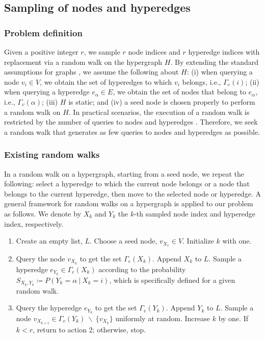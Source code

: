 \subsection{Sampling of nodes and hyperedges} \label{section:2.2}

\subsubsection{Problem definition}

Given a positive integer $r$, we sample $r$ node indices and $r$ hyperedge indices with replacement via a random walk on the hypergraph $H$. 
By extending the standard assumptions for graphs \cite{gjoka2010,nakajima2023}, we assume the following about $H$: (i) when querying a node $v_i \in V$, we obtain the set of hyperedges to which $v_i$ belongs, i.e., $\Gamma_e(i)$; (ii) when querying a hyperedge $e_{\alpha} \in E$, we obtain the set of nodes that belong to $e_{\alpha}$, i.e., $\Gamma_v(\alpha)$; (iii) $H$ is static; and (iv) a seed node is chosen properly to perform a random walk on $H$. 
In practical scenarios, the execution of a random walk is restricted by the number of queries to nodes and hyperedges \cite{hardiman2013, gjoka2011}. 
Therefore, we seek a random walk that generates as few queries to nodes and hyperedges as possible.

\subsubsection{Existing random walks} \label{section:2.2.2}

In a random walk on a hypergraph, starting from a seed node, we repeat the following: select a hyperedge to which the current node belongs or a node that belongs to the current hyperedge, then move to the selected node or hyperedge. 
A general framework for random walks on a hypergraph \cite{zhou2006, hayashi2020} is applied to our problem as follows. 
We denote by $X_k$ and $Y_k$ the $k$-th sampled node index and hyperedge index, respectively.

\begin{enumerate}
\item Create an empty list, $L$. Choose a seed node, $v_{X_1} \in V$. Initialize $k$ with one.
\item Query the node $v_{X_k}$ to get the set $\Gamma_e(X_{k})$. Append $X_k$ to $L$. Sample a hyperedge $e_{Y_{k}} \in \Gamma_e(X_{k})$ according to the probability $S_{X_k, Y_k} \coloneq P(Y_k=\alpha\ |\ X_k=i)$, which is specifically defined for a given random walk.
\item Query the hyperedge $e_{Y_k}$ to get the set $\Gamma_v(Y_{k})$. Append $Y_k$ to $L$. Sample a node $v_{X_{k+1}} \in \Gamma_v(Y_{k})\ \backslash\ \{v_{X_k}\}$ uniformly at random. Increase $k$ by one. If $k < r$, return to action 2; otherwise, stop.
\end{enumerate}

